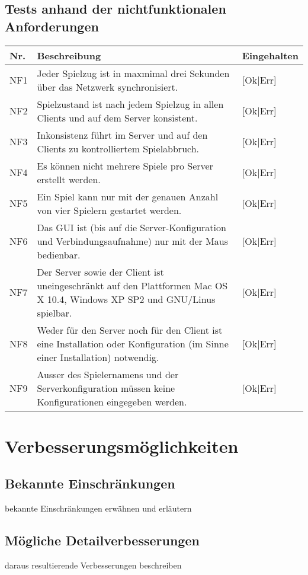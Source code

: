 \documentclass[a4paper,12pt,halfparskip,DIV14]{scrartcl}
\begin{document}

\subsection{Tests anhand der nichtfunktionalen Anforderungen}\label{sub:tests_anhand_der_nichtfunktionalen_anforderungen} %
\begin {tabular}{l | p{12cm} | l}
\hline \hline
\textbf{Nr.} & \textbf{Beschreibung} & \textbf{Eingehalten} \\
\hline
NF1 & Jeder Spielzug ist in maxmimal drei Sekunden über das Netzwerk synchronisiert. & [Ok|Err] \\
\hline
NF2 & Spielzustand ist nach jedem Spielzug in allen Clients und auf dem Server konsistent. & [Ok|Err] \\
\hline
NF3 & Inkonsistenz führt im Server und auf den Clients zu kontrolliertem Spielabbruch. & [Ok|Err] \\
\hline
NF4 & Es können nicht mehrere Spiele pro Server erstellt werden. & [Ok|Err] \\
\hline
NF5 & Ein Spiel kann nur mit der genauen Anzahl von vier Spielern gestartet werden. & [Ok|Err] \\
\hline
NF6 & Das GUI ist (bis auf die Server-Konfiguration und Verbindungsaufnahme) nur mit der Maus bedienbar. & [Ok|Err] \\
\hline
NF7 & Der Server sowie der Client ist uneingeschränkt auf den Plattformen Mac OS X 10.4, Windows XP SP2 und GNU/Linus spielbar. & [Ok|Err] \\
\hline
NF8 & Weder für den Server noch für den Client ist eine Installation oder Konfiguration (im Sinne einer Installation) notwendig. & [Ok|Err] \\
\hline
NF9 & Ausser des Spielernamens und der Serverkonfiguration müssen keine Konfigurationen eingegeben werden. & [Ok|Err] \\
\hline
\end{tabular}



\section{Verbesserungsmöglichkeiten} %
\label{sec:verbesserungsmöglichkeiten}
\subsection{Bekannte Einschränkungen} %
\label{sub:bekannte_einschränkungen}
bekannte Einschränkungen erwähnen und erläutern
\subsection{Mögliche Detailverbesserungen} %
\label{sub:mögliche_detailverbesserungen}
daraus resultierende Verbesserungen beschreiben
\end{document}
